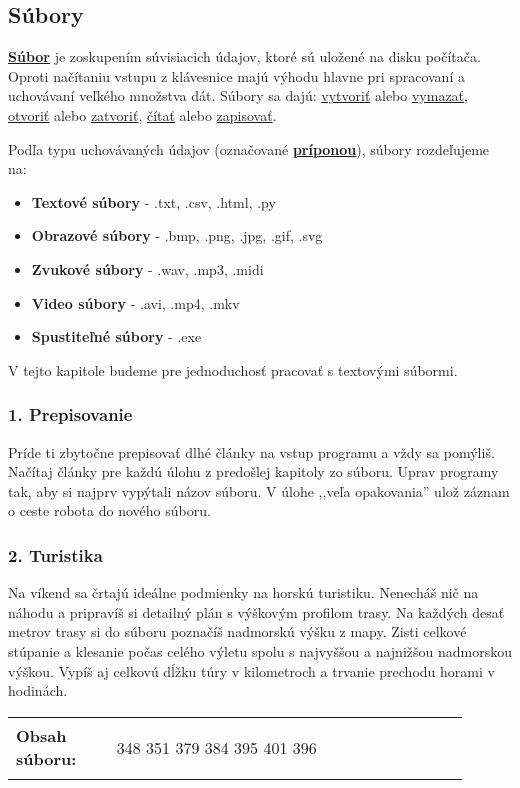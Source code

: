 \subsection{Súbory}
\underline{\textbf{Súbor}} je zoskupením súvisiacich údajov, ktoré sú uložené na disku počítača. Oproti načítaniu vstupu z klávesnice majú výhodu hlavne pri spracovaní a uchovávaní veľkého množstva dát. Súbory sa dajú: \underline{vytvoriť} alebo \underline{vymazať}, \underline{otvoriť} alebo \underline{zatvoriť}, \underline{čítať} alebo \underline{zapisovať}.

Podľa typu uchovávaných údajov (označované \underline{\textbf{príponou}}), súbory rozdeľujeme na:
\begin{itemize}[noitemsep]
\item \textbf{Textové súbory} - .txt, .csv, .html, .py
\item \textbf{Obrazové súbory} - .bmp, .png, .jpg, .gif, .svg
\item \textbf{Zvukové súbory} - .wav, .mp3, .midi
\item \textbf{Video súbory} - .avi, .mp4, .mkv
\item \textbf{Spustiteľné súbory} - .exe
\end{itemize}
V tejto kapitole budeme pre jednoduchosť pracovať s textovými súbormi.

\subsubsection*{1. Prepisovanie}
Príde ti zbytočne prepisovať dlhé články na vstup programu a vždy sa pomýliš. Načítaj články pre každú úlohu z predošlej kapitoly zo súboru. Uprav programy tak, aby si najprv vypýtali názov súboru. V úlohe ,,veľa opakovania'' ulož záznam o ceste robota do nového súboru.


\subsubsection*{2. Turistika}
Na víkend sa črtajú ideálne podmienky na horskú turistiku. Nenecháš nič na náhodu a pripravíš si detailný plán s výškovým profilom trasy. Na každých desať metrov trasy si do súboru poznačíš nadmorskú výšku z mapy. Zisti celkové stúpanie a klesanie počas celého výletu spolu s najvyššou a najnižšou nadmorskou výškou. Vypíš aj celkovú dĺžku túry v kilometroch a trvanie prechodu horami v hodinách.

\begin{tabular}{@{}p{0.2\linewidth}p{0.7\linewidth}}
\textbf{\small Obsah súboru:} &
\vspace{-3em}
\begin{code}
348
351
379
384
395
401
396
\end{code}
\end{tabular}

